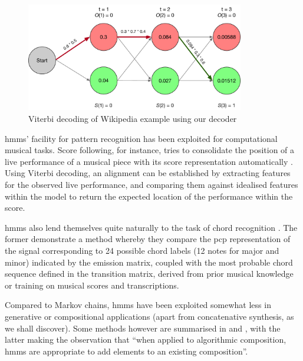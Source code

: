 {{{{{{{{\begin{figure}
	\begin{center}
		\includegraphics[width=0.85\textwidth]{ch05_pyconcat/figures/regular_viterbi.pdf}
	\end{center}
	\caption[Viterbi decoding of Wikipedia example using our decoder]{Viterbi decoding of Wikipedia example using our decoder}
	\label{fig:viterbi_basic}
\end{figure}

\acrshort{hmm}s' facility for pattern recognition has been exploited for computational musical tasks. Score following, for instance, tries to consolidate the position of a live performance of a musical piece with its score representation automatically \citep{Orio2003}. Using Viterbi decoding, an alignment can be established by extracting features for the observed live performance, and comparing them against idealised features within the model to return the expected location of the performance within the score.

\acrshort{hmm}s also lend themselves quite naturally to the task of chord recognition \citep{Papadopoulos2007, Cho2010, Sheh2003}. The former demonstrate a method whereby they compare the \acrshort{pcp} representation of the signal corresponding to 24 possible chord labels (12 notes for major and minor) indicated by the emission matrix, coupled with the most probable chord sequence defined in the transition matrix, derived from prior musical knowledge or training on musical scores and transcriptions.

Compared to Markov chains, \acrshort{hmm}s have been exploited somewhat less in generative or compositional applications (apart from concatenative synthesis, as we shall discover). Some methods however are summarised in \cite{Fernandez2013} and \cite{Nierhaus2009}, with the latter making the observation that “when applied to algorithmic composition, \acrshort{hmm}s are appropriate to add elements to an existing composition”. 

}}}}}}}}
